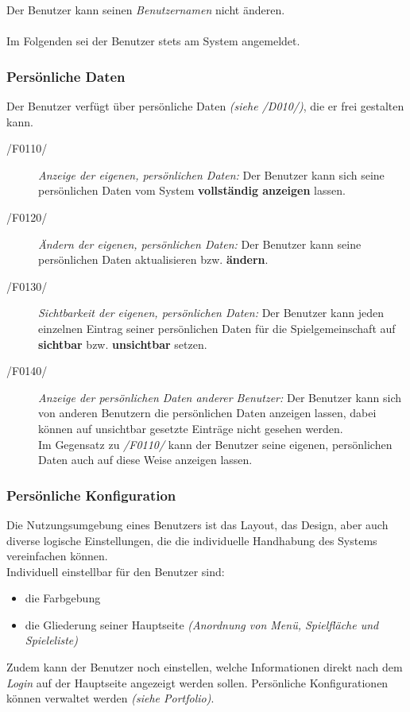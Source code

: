 Der Benutzer kann seinen \textit{Benutzernamen} nicht änderen.\\
\\
Im Folgenden sei der Benutzer stets am System angemeldet.

\subsubsection{Persönliche Daten}

Der Benutzer verfügt über persönliche Daten \textit{(siehe /D010/)}, die er frei gestalten kann.

\begin{description}
  \item[/F0110/]
    \textit{Anzeige der eigenen, persönlichen Daten:}
    Der Benutzer kann sich seine persönlichen Daten vom System \textbf{vollständig anzeigen} lassen.
  \item[/F0120/]
    \textit{Ändern der eigenen, persönlichen Daten:}
    Der Benutzer kann seine persönlichen Daten aktualisieren bzw. \textbf{ändern}.
  \item[/F0130/]
    \textit{Sichtbarkeit der eigenen, persönlichen Daten:}
    Der Benutzer kann jeden einzelnen Eintrag seiner persönlichen Daten für die Spielgemeinschaft auf \textbf{sichtbar} bzw.
    \textbf{unsichtbar} setzen.
  \item[/F0140/]
    \textit{Anzeige der persönlichen Daten anderer Benutzer:}
    Der Benutzer kann sich von anderen Benutzern die persönlichen Daten anzeigen lassen,
    dabei können auf unsichtbar gesetzte Einträge nicht gesehen werden.\\
    Im Gegensatz zu \textit{/F0110/} kann der Benutzer seine eigenen, persönlichen Daten auch auf diese Weise anzeigen lassen.
\end{description}


\subsubsection{Persönliche Konfiguration}

Die Nutzungsumgebung eines Benutzers ist das Layout, das Design, aber auch diverse logische Einstellungen,
die die individuelle Handhabung des Systems vereinfachen können.\\
Individuell einstellbar für den Benutzer sind:
\begin{itemize}
  \item die Farbgebung
  \item die Gliederung seiner Hauptseite \textit{(Anordnung von Menü, Spielfläche und Spieleliste)}
\end{itemize}
Zudem kann der Benutzer noch einstellen, welche Informationen direkt nach dem \textit{Login} auf der Hauptseite angezeigt werden sollen.
Persönliche Konfigurationen können verwaltet werden \textit{(siehe Portfolio)}.

